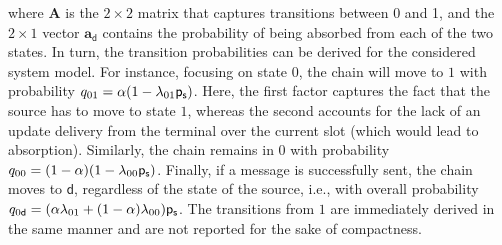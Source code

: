 where $\mathbf A$ is the $2\times 2$ matrix that captures transitions between $0$ and 1, and the $2\times 1$ vector $\mathbf a_{\mathsf d}$ contains the probability of being absorbed from each of the two states. In turn, the transition probabilities can be derived for the considered system model. For instance, focusing on state $0$, the chain will move to $1$ with probability $q_{01} = \alpha (1-\lambda_{01}\mathsf{p_s})$. Here, the first factor captures the fact that the source has to move to state $1$, whereas the second accounts for the lack of an update delivery from the terminal over the current slot (which would lead to absorption). Similarly, the chain remains in $0$ with probability \mbox{$q_{00}=(1-\alpha)(1-\lambda_{00}\mathsf{p_s})$}. Finally, if a message is successfully sent, the chain moves to $\mathsf d$, regardless of the state of the source, i.e., with overall probability $q_{0\mathsf d} = (\alpha\lambda_{01}+(1-\alpha)\lambda_{00})\mathsf{p_s}$. The transitions from $1$ are immediately derived in the same manner and are not reported for the sake of compactness. 


